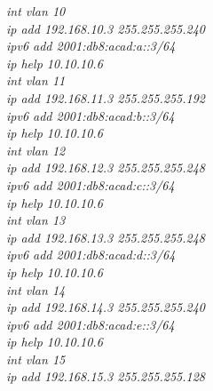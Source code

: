 \documentclass[a4paper, 12pt]{article}
\begin{document}
\hspace*{2cm}\textit{int vlan 10\\
\hspace*{2cm}ip add 192.168.10.3 255.255.255.240\\
\hspace*{2cm}ipv6 add 2001:db8:acad:a::3/64\\
\hspace*{2cm}ip help 10.10.10.6\\
\hspace*{2cm}int vlan 11\\
\hspace*{2cm}ip add 192.168.11.3 255.255.255.192\\
\hspace*{2cm}ipv6 add 2001:db8:acad:b::3/64\\
\hspace*{2cm}ip help 10.10.10.6\\
\hspace*{2cm}int vlan 12\\
\hspace*{2cm}ip add 192.168.12.3 255.255.255.248\\
\hspace*{2cm}ipv6 add 2001:db8:acad:c::3/64\\
\hspace*{2cm}ip help 10.10.10.6\\
\hspace*{2cm}int vlan 13\\
\hspace*{2cm}ip add 192.168.13.3 255.255.255.248\\
\hspace*{2cm}ipv6 add 2001:db8:acad:d::3/64\\
\hspace*{2cm}ip help 10.10.10.6\\
\hspace*{2cm}int vlan 14\\
\hspace*{2cm}ip add 192.168.14.3 255.255.255.240\\
\hspace*{2cm}ipv6 add 2001:db8:acad:e::3/64\\
\hspace*{2cm}ip help 10.10.10.6\\
\hspace*{2cm}int vlan 15\\
\hspace*{2cm}ip add 192.168.15.3 255.255.255.128\\
}
\end{document}
